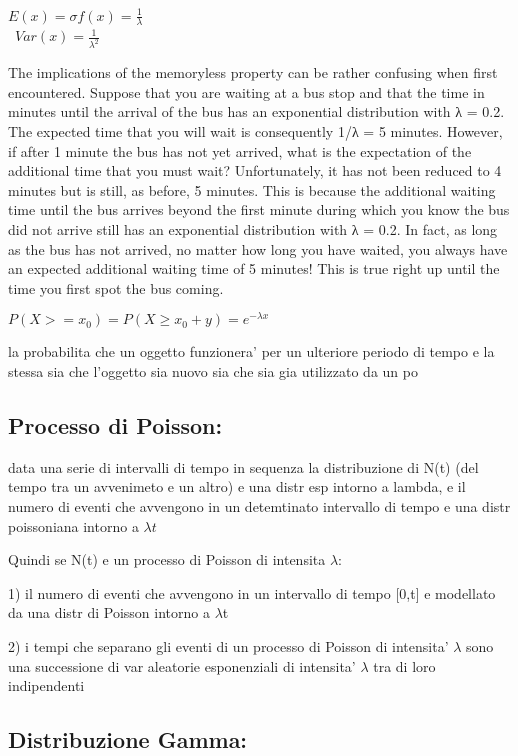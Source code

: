 \documentclass{book}
\begin{document}
$E(x)=\sigma f(x)=\frac{1}{\lambda}$\\\
$Var(x)=\frac{1}{\lambda^2}$


The implications of the memoryless property can be rather confusing when first encountered.
Suppose that you are waiting at a bus stop and that the time in minutes until the arrival
of the bus has an exponential distribution with λ = 0.2. The expected time that you will wait
is consequently 1/λ = 5 minutes. However, if after 1 minute the bus has not yet arrived, what
is the expectation of the additional time that you must wait?
Unfortunately, it has not been reduced to 4 minutes but is still, as before, 5 minutes. This is
because the additional waiting time until the bus arrives beyond the first minute during which
you know the bus did not arrive still has an exponential distribution with λ = 0.2. In fact,
as long as the bus has not arrived, no matter how long you have waited, you always have an
expected additional waiting time of 5 minutes! This is true right up until the time you first
spot the bus coming.

$P(X >= x_{0}) = P(X \ge x_{0}+y) = e^{- \lambda x}$

la probabilita che un oggetto funzionera' per un ulteriore periodo di tempo e la stessa sia che l'oggetto
sia nuovo sia che sia gia utilizzato da un po

\subsection{Processo di Poisson:}

data una serie di intervalli di tempo in sequenza la distribuzione di N(t) (del tempo tra un avvenimeto e un altro)
e una distr esp intorno a lambda, e il numero di eventi che avvengono in un detemtinato intervallo di tempo e una distr poissoniana
intorno a $\lambda t$

Quindi se N(t) e un processo di Poisson di intensita $\lambda$:

	1)	il numero di eventi che avvengono in un intervallo di tempo [0,t] e modellato
		da una distr di Poisson intorno a $\lambda$t

	2)	i tempi che separano gli eventi di un processo di Poisson di intensita' $\lambda$
		sono una successione di var aleatorie esponenziali di intensita' $\lambda$ tra di loro
		indipendenti


\subsection{Distribuzione Gamma:}
\end{document}
